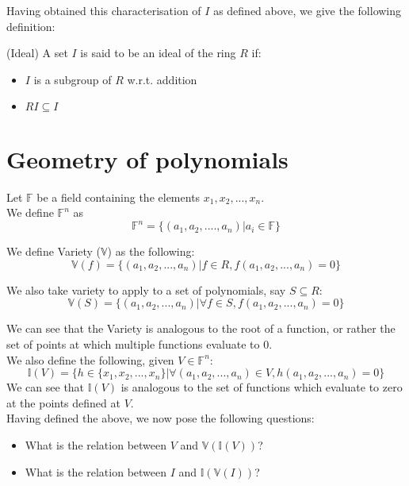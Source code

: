 Having obtained this characterisation of $I$ as defined above, we give the following definition:
\begin{definition} (Ideal)
A set $I$ is said to be an ideal of the ring $R$ if:
\begin{itemize}
\item $I$ is a subgroup of $R$ w.r.t. addition
\item $RI \subseteq I$
\end{itemize}
\end{definition}

\section{Geometry of polynomials}
Let $\mathbb{F}$ be a field containing the elements $x_1,x_2,...,x_n$.\\
We define $\mathbb{F}^n$ as 
\[
\mathbb{F}^n = \{(a_1,a_2,....,a_n) | a_i \in \mathbb{F}\}
\]

We define Variety ($\mathbb{V}$) as the following:
\begin{equation}
\mathbb{V}(f) = \{(a_1,a_2,...,a_n) | f \in R, f(a_1,a_2,...,a_n)=0\}
\end{equation}

We also take variety to apply to a set of polynomials, say $S \subseteq R$:
\begin{equation}
\mathbb{V}(S) = \{(a_1,a_2,...,a_n) | \forall f \in S, f(a_1,a_2,...,a_n)=0\}
\end{equation}

We can see that the Variety is analogous to the root of a function, or rather the set of points at which multiple functions evaluate to 0.\\
We also define the following, given $V \in \mathbb{F}^n$:
\begin{equation}
\mathbb{I}(V) = \{h \in \{x_1,x_2,...,x_n\} | \forall (a_1,a_2,...,a_n) \in V, h(a_1,a_2,...,a_n) = 0 \}
\end{equation}
We can see that $\mathbb{I}(V)$ is analogous to the set of functions which evaluate to zero at the points defined at $V$.\\

Having defined the above, we now pose the following questions:
\begin{itemize}
\item What is the relation between $V$ and $\mathbb{V}(\mathbb{I}(V))$?
\item What is the relation between $I$ and $\mathbb{I}(\mathbb{V}(I))$?
\end{itemize}









